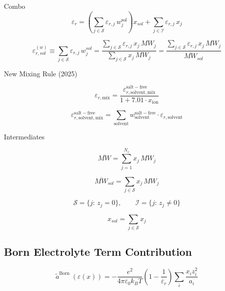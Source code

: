\documentclass[12pt, letterpaper]{article}
\begin{document}
Combo
\begin{equation}
\varepsilon_r = \left(\sum_{j\in\mathcal S}\varepsilon_{r,j}\,w_j^{\mathrm{sol}}\right) x_{sol} + \sum_{j\in\mathcal I}\varepsilon_{r,j}\,x_j
\end{equation}

\begin{equation}
\varepsilon_{r,sol}^{(w)} \equiv \sum_{j\in\mathcal S}\varepsilon_{r,j}\,w_j^{sol} = \frac{\sum_{j\in\mathcal S}\varepsilon_{r,j}\,x_j\,MW_j}{\sum_{j\in\mathcal S}x_j\,MW_j} = \frac{\sum_{j\in\mathcal S}\varepsilon_{r,j}\,x_j\,MW_j}{\overline{MW}_{sol}}
\end{equation}

New Mixing Rule (2025) \cite{Figiel2025}

\begin{equation}
\varepsilon_{r,\mathrm{mix}}=\frac{\varepsilon_{r,\mathrm{solvent,mix}}^{\mathrm{salt-free}}}{1+7.01\cdot x_{\mathrm{ion}}}
\end{equation}

\begin{equation}
\varepsilon_{r,\mathrm{solvent,mix}}^{\mathrm{salt-free}}=\sum_{\mathrm{solvent}}w_{\mathrm{solvent}}^{\mathrm{salt-free}}\cdot\varepsilon_{r,\mathrm{solvent}}
\end{equation}


Intermediates

\begin{equation}
\overline{MW}=\sum_{j=1}^{N_c} x_j\,MW_j
\end{equation}

\begin{equation}
\overline{MW}_{sol}=\sum_{j\in\mathcal S}x_j\,MW_j
\end{equation}

\begin{equation}
\mathcal S=\{j:\,z_j=0\},\qquad \mathcal I=\{j:\,z_j\neq 0\}
\end{equation}

\begin{equation}
x_{sol}=\sum_{j\in\mathcal S}x_j
\end{equation}

\subsection{Born Electrolyte Term Contribution}

\cite{Bulow2021a}

\begin{equation}
\tilde{a}^{\text {Born }}(\varepsilon(x))=-\frac{e^2}{4 \pi \varepsilon_0 k_B T}\left(1-\frac{1}{\varepsilon_r}\right) \sum_i \frac{x_i z_i^2}{a_i}
\end{equation}
\end{document}
